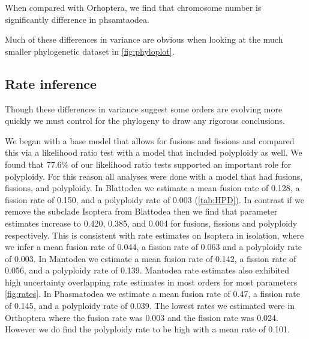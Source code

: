 When compared with Orhoptera, we find that chromosome number is significantly difference in phsamtaodea.

Much of these differences in variance are obvious when looking at the much smaller phylogenetic dataset in \cref{fig:phyloplot}.

\subsection{Rate inference}
Though these differences in variance suggest some orders are evolving more quickly we must control for the phylogeny to draw any rigorous conclusions.

We began with a base model that allows for fusions and fissions and compared this via a likelihood ratio test with a model that included polyploidy as well.
We found that 77.6\% of our likelihood ratio tests supported an important role for polyploidy.
For this reason all analyses were done with a model that had fusions, fissions, and polyploidy.
In Blattodea we estimate a mean fusion rate of 0.128, a fission rate of 0.150, and a polyploidy rate of 0.003 (\cref{tab:HPD}).
In contrast if we remove the subclade Isoptera from Blattodea then we find that parameter estimates increase to 0.420, 0.385, and 0.004 for fusions, fissions and polyploidy respectively.
This is consistent with rate estimates on Isoptera in isolation, where we infer a mean fusion rate of 0.044, a fission rate of 0.063 and a polyploidy rate of 0.003.
In Mantodea we estimate a mean fusion rate of 0.142, a fission rate of 0.056, and a polyploidy rate of 0.139.
Mantodea rate estimates also exhibited high uncertainty overlapping rate estimates in most orders for most parameters \cref{fig:rates}.
In Phasmatodea we estimate a mean fusion rate of 0.47, a fission rate of 0.145, and a polyploidy rate of 0.039.
The lowest rates we estimated were in Orthoptera where the fusion rate was 0.003 and the fission rate was 0.024. However we do find the polyploidy rate to be high with a mean rate of 0.101.



